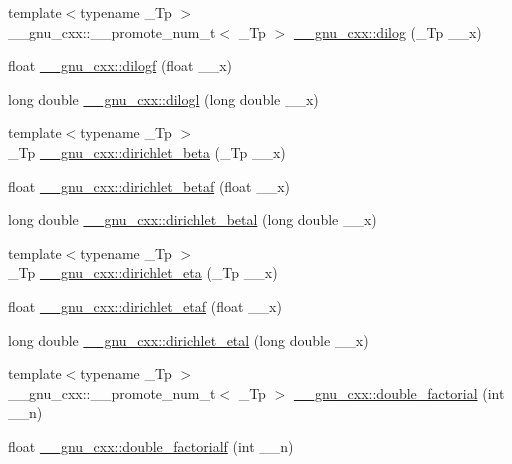 \begin{DoxyCompactItemize}
\item 
{\footnotesize template$<$typename \+\_\+\+Tp $>$ }\\\+\_\+\+\_\+gnu\+\_\+cxx\+::\+\_\+\+\_\+promote\+\_\+num\+\_\+t$<$ \+\_\+\+Tp $>$ \hyperlink{group__gnu__math__spec__func_ga8fceba3ecc618971e0e3c089d8dc49cf}{\+\_\+\+\_\+gnu\+\_\+cxx\+::dilog} (\+\_\+\+Tp \+\_\+\+\_\+x)
\item 
float \hyperlink{group__gnu__math__spec__func_ga901091e0e7ce7d6113ae6a86f4865a92}{\+\_\+\+\_\+gnu\+\_\+cxx\+::dilogf} (float \+\_\+\+\_\+x)
\item 
long double \hyperlink{group__gnu__math__spec__func_gae90c13ee690ebaf10a18a900fe2646f9}{\+\_\+\+\_\+gnu\+\_\+cxx\+::dilogl} (long double \+\_\+\+\_\+x)
\item 
{\footnotesize template$<$typename \+\_\+\+Tp $>$ }\\\+\_\+\+Tp \hyperlink{group__gnu__math__spec__func_ga87f600ab9980dea8c3d06c70adba58f3}{\+\_\+\+\_\+gnu\+\_\+cxx\+::dirichlet\+\_\+beta} (\+\_\+\+Tp \+\_\+\+\_\+x)
\item 
float \hyperlink{group__gnu__math__spec__func_ga33e76ff6f8c24c530ad5941ce384d3dd}{\+\_\+\+\_\+gnu\+\_\+cxx\+::dirichlet\+\_\+betaf} (float \+\_\+\+\_\+x)
\item 
long double \hyperlink{group__gnu__math__spec__func_ga210f1cc30defa00ceb6213054893df42}{\+\_\+\+\_\+gnu\+\_\+cxx\+::dirichlet\+\_\+betal} (long double \+\_\+\+\_\+x)
\item 
{\footnotesize template$<$typename \+\_\+\+Tp $>$ }\\\+\_\+\+Tp \hyperlink{group__gnu__math__spec__func_ga31b1fde4c1d62963c478d3464adb3283}{\+\_\+\+\_\+gnu\+\_\+cxx\+::dirichlet\+\_\+eta} (\+\_\+\+Tp \+\_\+\+\_\+x)
\item 
float \hyperlink{group__gnu__math__spec__func_gaf4d7781d0d5e6071b2edd26b30d1c3f9}{\+\_\+\+\_\+gnu\+\_\+cxx\+::dirichlet\+\_\+etaf} (float \+\_\+\+\_\+x)
\item 
long double \hyperlink{group__gnu__math__spec__func_ga1b7fa6ad635973504ef5caaa3fa4d44e}{\+\_\+\+\_\+gnu\+\_\+cxx\+::dirichlet\+\_\+etal} (long double \+\_\+\+\_\+x)
\item 
{\footnotesize template$<$typename \+\_\+\+Tp $>$ }\\\+\_\+\+\_\+gnu\+\_\+cxx\+::\+\_\+\+\_\+promote\+\_\+num\+\_\+t$<$ \+\_\+\+Tp $>$ \hyperlink{group__gnu__math__spec__func_ga206cdf1ae7f9a0df3048af18892b8ba8}{\+\_\+\+\_\+gnu\+\_\+cxx\+::double\+\_\+factorial} (int \+\_\+\+\_\+n)
\item 
float \hyperlink{group__gnu__math__spec__func_ga85ec284e603f32d18970bbdbb12d5150}{\+\_\+\+\_\+gnu\+\_\+cxx\+::double\+\_\+factorialf} (int \+\_\+\+\_\+n)

\end{DoxyCompactItemize}
